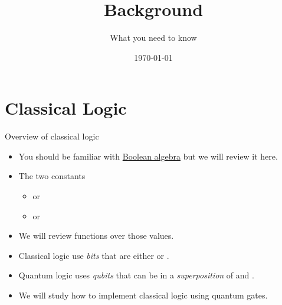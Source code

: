 
\title{Background}
\subtitle{What you need to know}

\date{\today}

\begin{frame}
\maketitle
\end{frame}

\section{Classical Logic}

\begin{frame}{Overview of classical logic}
\begin{itemize}
    \item You should be familiar with \href{https://en.wikipedia.org/wiki/Boolean_algebra}{Boolean algebra} but we will review it here.
    \item The two constants
    \begin{itemize}
        \item \Zero{} or \False{}
        \item \One{} or \True{}
    \end{itemize}
    \item We will review functions over those values.
    \item Classical logic use \emph{bits} that are either \True{} or \False{}.
    \item Quantum logic uses \emph{qubits} that can be in a \emph{superposition} of \Zero{} and \One{}.
    \item We will study how to implement classical logic using quantum gates.
\end{itemize}
    
\end{frame}


